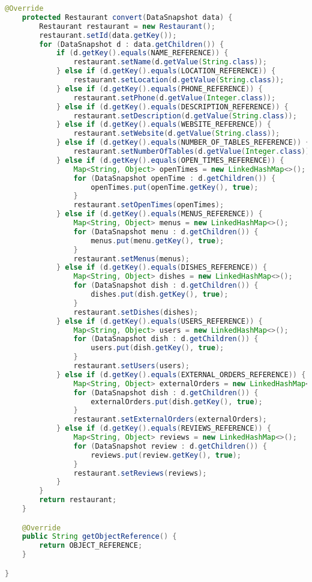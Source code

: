 \begin{lstlisting}[language=java,firstnumber=1]
    @Override
    protected Restaurant convert(DataSnapshot data) {
        Restaurant restaurant = new Restaurant();
        restaurant.setId(data.getKey());
        for (DataSnapshot d : data.getChildren()) {
            if (d.getKey().equals(NAME_REFERENCE)) {
                restaurant.setName(d.getValue(String.class));
            } else if (d.getKey().equals(LOCATION_REFERENCE)) {
                restaurant.setLocation(d.getValue(String.class));
            } else if (d.getKey().equals(PHONE_REFERENCE)) {
                restaurant.setPhone(d.getValue(Integer.class));
            } else if (d.getKey().equals(DESCRIPTION_REFERENCE)) {
                restaurant.setDescription(d.getValue(String.class));
            } else if (d.getKey().equals(WEBSITE_REFERENCE)) {
                restaurant.setWebsite(d.getValue(String.class));
            } else if (d.getKey().equals(NUMBER_OF_TABLES_REFERENCE)) {
                restaurant.setNumberOfTables(d.getValue(Integer.class));
            } else if (d.getKey().equals(OPEN_TIMES_REFERENCE)) {
                Map<String, Object> openTimes = new LinkedHashMap<>();
                for (DataSnapshot openTime : d.getChildren()) {
                    openTimes.put(openTime.getKey(), true);
                }
                restaurant.setOpenTimes(openTimes);
            } else if (d.getKey().equals(MENUS_REFERENCE)) {
                Map<String, Object> menus = new LinkedHashMap<>();
                for (DataSnapshot menu : d.getChildren()) {
                    menus.put(menu.getKey(), true);
                }
                restaurant.setMenus(menus);
            } else if (d.getKey().equals(DISHES_REFERENCE)) {
                Map<String, Object> dishes = new LinkedHashMap<>();
                for (DataSnapshot dish : d.getChildren()) {
                    dishes.put(dish.getKey(), true);
                }
                restaurant.setDishes(dishes);
            } else if (d.getKey().equals(USERS_REFERENCE)) {
                Map<String, Object> users = new LinkedHashMap<>();
                for (DataSnapshot dish : d.getChildren()) {
                    users.put(dish.getKey(), true);
                }
                restaurant.setUsers(users);
            } else if (d.getKey().equals(EXTERNAL_ORDERS_REFERENCE)) {
                Map<String, Object> externalOrders = new LinkedHashMap<>();
                for (DataSnapshot dish : d.getChildren()) {
                    externalOrders.put(dish.getKey(), true);
                }
                restaurant.setExternalOrders(externalOrders);
            } else if (d.getKey().equals(REVIEWS_REFERENCE)) {
                Map<String, Object> reviews = new LinkedHashMap<>();
                for (DataSnapshot review : d.getChildren()) {
                    reviews.put(review.getKey(), true);
                }
                restaurant.setReviews(reviews);
            }
        }
        return restaurant;
    }

    @Override
    public String getObjectReference() {
        return OBJECT_REFERENCE;
    }

}
\end{lstlisting}

